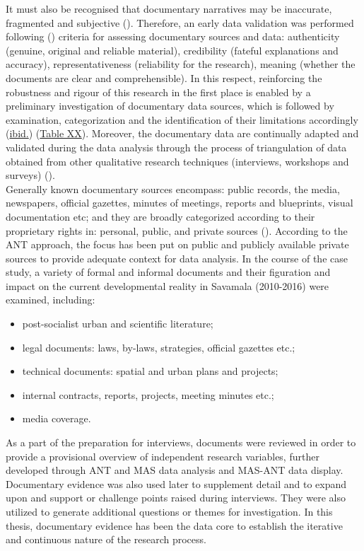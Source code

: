 \documentclass[11pt]{report}
\begin{document}
{{{{It must also be recognised that documentary narratives may be inaccurate, fragmented and subjective (\href{Foster}{\citealt{foster_power_1994}}). 
Therefore, an early data validation was performed following (\href{Scott}{\citealt{scott_matter_1991}}) criteria for assessing documentary sources and data: authenticity (genuine, original and reliable material), credibility (fateful explanations and accuracy), representativeness (reliability for the research), meaning (whether the documents are clear and comprehensible). In this respect, reinforcing the robustness and rigour of this research in the first place is enabled by a preliminary investigation of documentary data sources, which is followed by examination, categorization and the identification of their limitations accordingly (\href{Scott}{ibid.}) (\href{Table Data sources}{Table XX}). Moreover, the documentary data are continually adapted and validated during the data analysis through the process of triangulation of data obtained from other qualitative research techniques (interviews, workshops and surveys) 
 (\href{Yin}{\citealt{yin_case_2003}}).
\\

Generally known documentary sources encompass: public records, the media, newspapers, official gazettes, minutes of meetings, reports and blueprints, visual documentation etc; and they are broadly categorized according to their proprietary rights in: personal, public, and private sources (\href{Payne}{\citealt{payne_key_2004}}). According to the ANT approach, the focus has been put on public and publicly available private sources to provide adequate context for data analysis. In the course of the case study, a variety of formal and informal documents and their figuration and impact on the current developmental reality in Savamala (2010-2016) were examined, including:

\begin{itemize}
\item post-socialist urban and scientific literature;
\item legal documents: laws, by-laws, strategies, official gazettes etc.;
\item technical documents: spatial and urban plans and projects;
\item internal contracts, reports, projects, meeting minutes etc.;
\item media coverage. 
\end{itemize}

As a part of the preparation for interviews, documents were reviewed in order to provide a provisional overview of independent research variables, further developed through ANT and MAS data analysis and MAS-ANT data display. Documentary evidence was also used later to supplement detail and to expand upon and support or challenge points raised during interviews. They were also utilized to generate additional questions or themes for investigation. In this thesis, documentary evidence has been the data core to establish the iterative and continuous nature of the research process. 

}}}}
\end{document}
